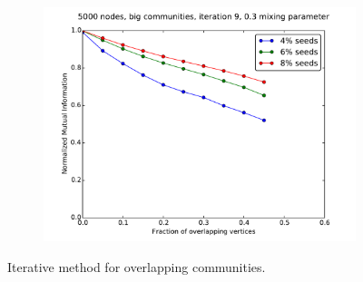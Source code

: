\begin{figure}
\begin{subfigure}{0.5\textwidth}
    \includegraphics[width=\linewidth]{allplots/overlap_iter_3mu_d.pdf}
    \end{subfigure}
    \caption{Iterative method for overlapping communities.}
\end{figure}

